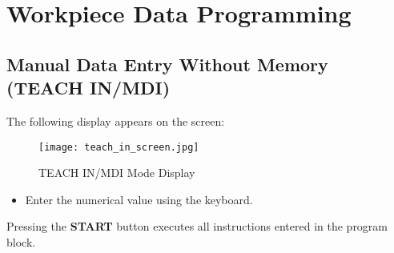\chapter{Workpiece Data Programming}

\section{Manual Data Entry Without Memory (TEACH IN/MDI)}

\procedure

\begin{itemize}
\end{itemize}

The following display appears on the screen:

\begin{figure}[h]
    \centering
    \texttt{[image: teach\_in\_screen.jpg]}
    \caption{TEACH IN/MDI Mode Display}
\end{figure}

\begin{itemize}
\end{itemize}

\vspace{.5cm}

\begin{itemize}
    \item Enter the numerical value using the keyboard.
\end{itemize}

\begin{itemize}
\end{itemize}

\vspace{.5cm}

\begin{itemize}
\end{itemize}

Pressing the \textbf{START} button executes all instructions entered in the program block.

\begin{itemize}
\end{itemize}

